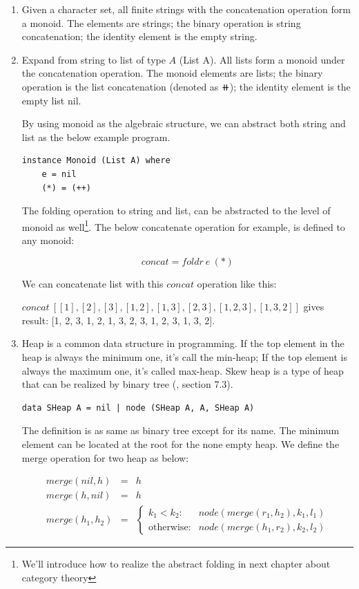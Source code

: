 \documentclass{article}
\begin{document}
\begin{enumerate}
\item Given a character set, all finite strings with the concatenation operation form a monoid. The elements are strings; the binary operation is string concatenation; the identity element is the empty string.
\item Expand from string to list of type $A$ (List A). All lists form a monoid under the concatenation operation. The monoid elements are lists; the binary operation is the list concatenation (denoted as $\doubleplus$); the identity element is the empty list nil.

By using monoid as the algebraic structure, we can abstract both string and list as the below example program.

\begin{lstlisting}
instance Monoid (List A) where
    e = nil
    (*) = (++)
\end{lstlisting}

The folding operation to string and list, can be abstracted to the level of monoid as well\footnote{We'll introduce how to realize the abstract folding in next chapter about category theory}. The below concatenate operation for example, is defined to any monoid:

\[
concat = foldr\ e\ (*)
\]

We can concatenate list with this $concat$ operation like this:

$concat\ [[1], [2], [3], [1, 2], [1, 3], [2, 3], [1, 2, 3], [1, 3, 2]]$ gives result: [1, 2, 3, 1, 2, 1, 3, 2, 3, 1, 2, 3, 1, 3, 2].

\item Heap is a common data structure in programming. If the top element in the heap is always the minimum one, it's call the min-heap; If the top element is always the maximum one, it's called max-heap. Skew heap is a type of heap that can be realized by binary tree (\cite{LiuXinyu2017}, section 7.3).

\begin{lstlisting}
data SHeap A = nil | node (SHeap A, A, SHeap A)
\end{lstlisting}

The definition is as same as binary tree except for its name. The minimum element can be located at the root for the none empty heap. We define the merge operation for two heap as below:

\[
\begin{array}{rcl}
merge(nil, h) & = & h \\
merge(h, nil) & = & h \\
merge(h_1, h_2) & = &
  \begin{cases}
  k_1 < k_2 : & node(merge(r_1, h_2), k_1, l_1) \\
  \text{otherwise}: & node(merge(h_1, r_2), k_2, l_2)
  \end{cases}
\end{array}
\]


\end{enumerate}
\end{document}
